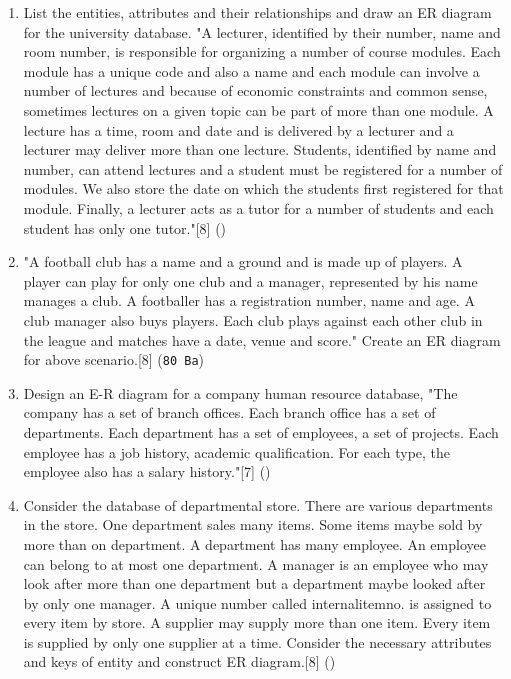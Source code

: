 \documentclass[12pt]{article}
\begin{document}
\begin{enumerate}
    \item List the entities, attributes and their relationships and draw an ER diagram for the university database. "A lecturer, identified by their number, name and room number, is responsible for organizing a number of course modules. Each module has a unique code and also a name and each module can involve a number of lectures and because of economic constraints and common sense, sometimes lectures on a given topic can be part of more than one module. A lecture has a time, room and date and is delivered by a lecturer and a lecturer may deliver more than one lecture. Students, identified by name and number, can attend lectures and a student must be registered for a number of modules. We also store the date on which the students first registered for that module. Finally, a lecturer acts as a tutor for a number of students and each student has only one tutor."\hfill[8] ()

    \item "A football club has a name and a ground and is made up of players. A player can play for only one club and a manager, represented by his name manages a club. A footballer has a registration number, name and age. A club manager also buys players. Each club plays against each other club in the league and matches have a date, venue and score." Create an ER diagram for above scenario.\hfill[8] (\texttt{80 Ba})

    \item Design an E-R diagram for a company human resource database, "The company has a set of branch offices. Each branch office has a set of departments. Each department has a set of employees, a set of projects. Each employee has a job history, academic qualification. For each type, the employee also has a salary history."\hfill[7] ()

    \item Consider the database of departmental store. There are various departments in the store. One department sales many items. Some items maybe sold by more than on department. A department has many employee. An employee can belong to at most one department. A manager is an employee who may look after more than one department but a department maybe looked after by only one manager. A unique number called internal\textunderscore item\textunderscore no. is assigned to every item by store. A supplier may supply more than one item. Every item is supplied by only one supplier at a time. Consider the necessary attributes and keys of entity and construct ER diagram.\hfill[8] ()


\end{enumerate}
\end{document}
